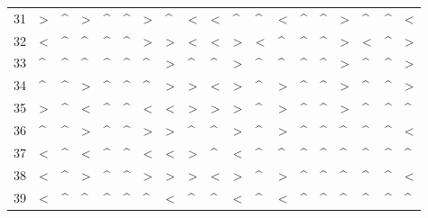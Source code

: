 \begin{tabular}{lllllllllllllllllll}
31  &  > &  \textasciicircum  &  > &  \textasciicircum  &  \textasciicircum  &  > &  \textasciicircum  &  < &  < &  \textasciicircum  &  \textasciicircum  &  < &  \textasciicircum  &  \textasciicircum  &  > &  \textasciicircum  &  \textasciicircum  &  < \\
32  &  < &  \textasciicircum  &  \textasciicircum  &  \textasciicircum  &  \textasciicircum  &  > &  > &  < &  < &  > &  < &  \textasciicircum  &  \textasciicircum  &  \textasciicircum  &  > &  < &  \textasciicircum  &  > \\
33  &  \textasciicircum  &  \textasciicircum  &  \textasciicircum  &  \textasciicircum  &  \textasciicircum  &  \textasciicircum  &  > &  \textasciicircum  &  \textasciicircum  &  > &  \textasciicircum  &  \textasciicircum  &  \textasciicircum  &  \textasciicircum  &  > &  \textasciicircum  &  \textasciicircum  &  > \\
34  &  \textasciicircum  &  \textasciicircum  &  > &  \textasciicircum  &  \textasciicircum  &  \textasciicircum  &  > &  > &  < &  > &  \textasciicircum  &  > &  \textasciicircum  &  \textasciicircum  &  > &  \textasciicircum  &  \textasciicircum  &  > \\
35  &  > &  \textasciicircum  &  < &  \textasciicircum  &  \textasciicircum  &  < &  < &  > &  > &  > &  \textasciicircum  &  > &  \textasciicircum  &  \textasciicircum  &  > &  \textasciicircum  &  \textasciicircum  &  \textasciicircum  \\
36  &  \textasciicircum  &  \textasciicircum  &  > &  \textasciicircum  &  \textasciicircum  &  > &  > &  \textasciicircum  &  \textasciicircum  &  > &  \textasciicircum  &  > &  \textasciicircum  &  \textasciicircum  &  \textasciicircum  &  \textasciicircum  &  \textasciicircum  &  < \\
37  &  < &  \textasciicircum  &  < &  \textasciicircum  &  \textasciicircum  &  < &  < &  > &  \textasciicircum  &  < &  \textasciicircum  &  \textasciicircum  &  \textasciicircum  &  \textasciicircum  &  \textasciicircum  &  \textasciicircum  &  \textasciicircum  &  \textasciicircum  \\
38  &  < &  \textasciicircum  &  > &  \textasciicircum  &  \textasciicircum  &  > &  > &  > &  < &  > &  \textasciicircum  &  > &  \textasciicircum  &  \textasciicircum  &  \textasciicircum  &  \textasciicircum  &  \textasciicircum  &  < \\
39  &  < &  \textasciicircum  &  \textasciicircum  &  \textasciicircum  &  \textasciicircum  &  \textasciicircum  &  < &  \textasciicircum  &  \textasciicircum  &  < &  \textasciicircum  &  < &  \textasciicircum  &  \textasciicircum  &  \textasciicircum  &  \textasciicircum  &  \textasciicircum  &  \textasciicircum  \\

\end{tabular}
